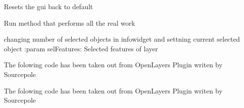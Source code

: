 \documentclass[letterpaper,10pt,english]{sphinxmanual}
\begin{document}
\begin{fulllineitems}

\begin{fulllineitems}
\label{\detokenize{code:Tilgjengelighet.Tilgjengelighet.reset}}
Resets the gui back to default

\end{fulllineitems}


\begin{fulllineitems}
\label{\detokenize{code:Tilgjengelighet.Tilgjengelighet.run}}
Run method that performs all the real work

\end{fulllineitems}


\begin{fulllineitems}
\label{\detokenize{code:Tilgjengelighet.Tilgjengelighet.selectedObjects}}
changing number of selected objects in infowidget and settning current selected object
:param selFeatures: Selected features of layer

\end{fulllineitems}


\begin{fulllineitems}
\label{\detokenize{code:Tilgjengelighet.Tilgjengelighet.setMapCrs}}
The folowing code has been taken out from OpenLayers Plugin writen by Sourcepole

\end{fulllineitems}


\begin{fulllineitems}
\label{\detokenize{code:Tilgjengelighet.Tilgjengelighet.setReferenceLayer}}
The folowing code has been taken out from OpenLayers Plugin writen by Sourcepole


\end{fulllineitems}
\end{fulllineitems}
\end{document}
